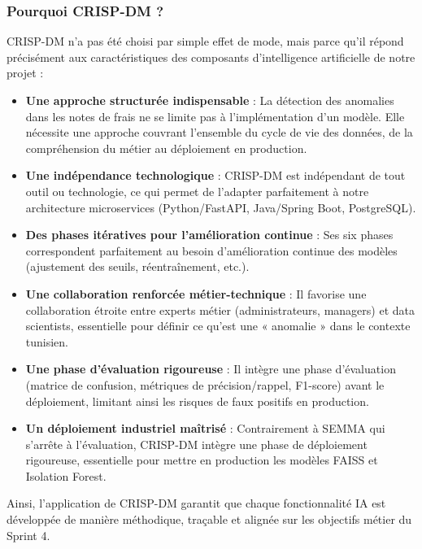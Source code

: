 \documentclass[12pt,a4paper]{report}
\begin{document}
\subsubsection{Pourquoi CRISP-DM ?}

CRISP-DM n'a pas été choisi par simple effet de mode, mais parce qu'il répond précisément aux caractéristiques des composants d'intelligence artificielle de notre projet :

\begin{itemize}
 \item \textbf{Une approche structurée indispensable} : La détection des anomalies dans les notes de frais ne se limite pas à l'implémentation d'un modèle. Elle nécessite une approche couvrant l'ensemble du cycle de vie des données, de la compréhension du métier au déploiement en production.
 
 \item \textbf{Une indépendance technologique} : CRISP-DM est indépendant de tout outil ou technologie, ce qui permet de l'adapter parfaitement à notre architecture microservices (Python/FastAPI, Java/Spring Boot, PostgreSQL).
 
 \item \textbf{Des phases itératives pour l'amélioration continue} : Ses six phases correspondent parfaitement au besoin d'amélioration continue des modèles (ajustement des seuils, réentraînement, etc.).
 
 \item \textbf{Une collaboration renforcée métier-technique} : Il favorise une collaboration étroite entre experts métier (administrateurs, managers) et data scientists, essentielle pour définir ce qu'est une « anomalie » dans le contexte tunisien.
 
 \item \textbf{Une phase d'évaluation rigoureuse} : Il intègre une phase d'évaluation (matrice de confusion, métriques de précision/rappel, F1-score) avant le déploiement, limitant ainsi les risques de faux positifs en production.
 
 \item \textbf{Un déploiement industriel maîtrisé} : Contrairement à SEMMA qui s'arrête à l'évaluation, CRISP-DM intègre une phase de déploiement rigoureuse, essentielle pour mettre en production les modèles FAISS et Isolation Forest.
\end{itemize}

Ainsi, l'application de CRISP-DM garantit que chaque fonctionnalité IA est développée de manière méthodique, traçable et alignée sur les objectifs métier du Sprint 4.
\end{document}
